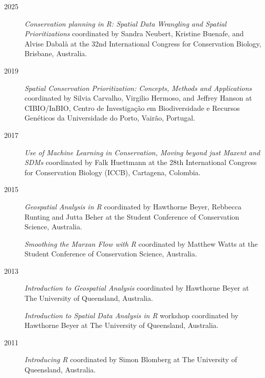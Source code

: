 \documentclass[12pt,a4paper]{article}
\begin{document}
\begin{description}

\item[2025] \textit{Conservation planning in R: Spatial Data Wrangling and Spatial Prioritizations} coordinated by Sandra Neubert, Kristine Buenafe, and Alvise Dabalà at the 32nd International Congress for Conservation Biology, Brisbane, Australia.

\item[2019] \textit{Spatial Conservation Prioritization: Concepts, Methods and Applications} coordinated by Silvia Carvalho, Virgilio Hermoso, and Jeffrey Hanson at CIBIO/InBIO, Centro de Investigação em Biodiversidade e Recursos Genéticos da Universidade do Porto, Vairão, Portugal.

\item[2017] \textit{Use of Machine Learning in Conservation, Moving beyond just Maxent and SDMs} coordinated by Falk Huettmann at the 28th International Congress for Conservation Biology (ICCB), Cartagena, Colombia.

\item[2015] \textit{Geospatial Analysis in R} coordinated by Hawthorne Beyer, Rebbecca Runting and Jutta Beher at the Student Conference of Conservation Science, Australia.

\item[] \textit{Smoothing the Marxan Flow with R} coordinated by Matthew Watts at the Student Conference of Conservation Science, Australia.

\item[2013] \textit{Introduction to Geospatial Analysis} coordinated by Hawthorne Beyer at The University of Queensland, Australia.

\item[] \textit{Introduction to Spatial Data Analysis in R} workshop coordinated by Hawthorne Beyer at The University of Queensland, Australia.

\item[2011] \textit{Introducing R} coordinated by Simon Blomberg at The University of Queensland, Australia.

\end{description}
\end{document}
